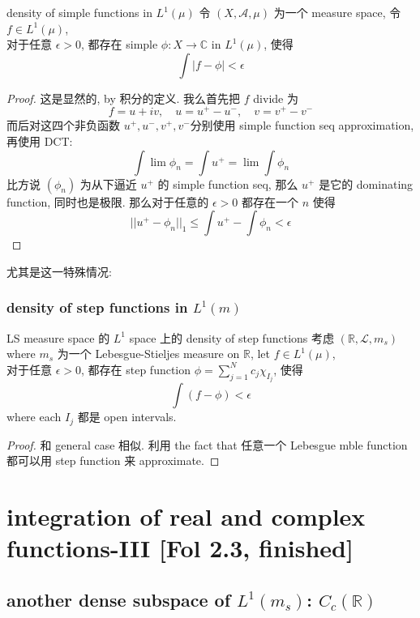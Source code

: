 \documentclass[lang=cn,11pt]{elegantbook}
\begin{document}
\begin{theorem}{density of simple functions in $L^1(\mu)$}
  令 $(X, \mathcal{A}, \mu)$ 为一个 measure space,  令 $f \in L^1(\mu)$, \\
    对于任意 $\epsilon > 0$, 都存在 simple $\phi: X \rightarrow \mathbb{C}$ in $L^1(\mu)$, 使得 \[
    \int |f - \phi| 
< \epsilon
    \]
\end{theorem}
\begin{proof}
    这是显然的, by 积分的定义. 我么首先把 $f$ divide 为 \[
    f = u +iv, \quad u = u^+ - u^-,\quad v = v^+ - v^-
    \]
    而后对这四个非负函数 $u^+,u^-, v^+, v^-$分别使用 simple function seq approximation, 再使用 DCT:
    \[
   \int \lim \phi_n =     \int u^+ =  \lim \int \phi_n
    \]
    比方说 $(\phi_n)$ 为从下逼近 $u^+$ 的 simple function seq, 那么 $u^+$ 是它的 dominating function, 同时也是极限. 那么对于任意的 $\epsilon > 0$ 都存在一个 $n$ 使得  \[
||u^+ - \phi_n||_1 \leq  \int u^+ -    \int \phi_n  < \epsilon
    \]
\end{proof}


尤其是这一特殊情况: 
\subsection{density of step functions in $L^1(m)$ }
\begin{theorem}{LS measure space 的 $L^1$ space 上的 density of step functions}
考虑 $(\mathbb{R}, \mathcal{L}, m_s)$ where $m_s$ 为一个 Lebesgue-Stieljes measure on $\mathbb{R}$, let $f \in L^1 (\mu)$,\\
对于任意 $\epsilon >0$, 都存在 step function $\phi = \sum_{j=1}^N c_j \chi_{I_j}$, 使得 \[
\int (f-\phi) < \epsilon
\] where each $I_j$ 都是 open intervals.
\end{theorem}
\begin{proof}
和 general case 相似. 利用 the fact that 任意一个 Lebesgue mble function 都可以用 step function 来 approximate.
\end{proof}







\chapter{integration of real and complex functions-III [Fol 2.3, finished]}
\section{another dense subspace of $L^1(m_s)$: $C_c (\mathbb{R})$}
\end{document}
